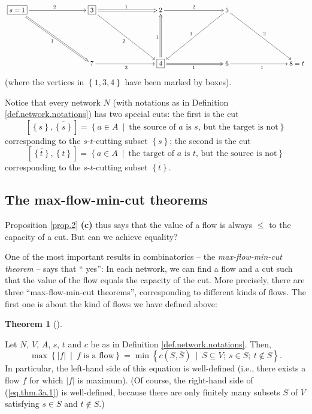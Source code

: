 \documentclass[numbers=enddot,12pt,final,onecolumn,notitlepage]{scrartcl}%
\theoremstyle{definition}
\newtheorem{theo}{Theorem}[section]
\newenvironment{theorem}[1][]
{\begin{theo}[#1]\begin{leftbar}}
{\end{leftbar}\end{theo}}
\begin{document}
\[%
\xymatrix@C=7pc@R=5pc{
\boxed{s = 1} \ar[r]^2 \ar@{=>}[dr]_1 & \boxed{3} \ar@{=>}[r]^1 \ar
[dr]_2 & 2 \ar[r]^2 & 5 \ar[dl]_1 \ar[dr]^2 \\
& 7 \ar[r]_3 & \boxed{4} \ar@{=>}[u]^1 \ar@{=>}[r]_1 & 6 \ar[r]_1 & 8 = t
}%
\]
(where the vertices in $\left\{  1,3,4\right\}  $ have been marked by boxes).

Notice that every network $N$ (with notations as in Definition
\ref{def.network.notations}) has two special cuts: the first is the cut
\[
\left[  \left\{  s\right\}  ,\overline{\left\{  s\right\}  }\right]  =\left\{
a\in A\ \mid\ \text{the source of }a\text{ is }s\text{, but the target is
not}\right\}
\]
corresponding to the $s$-$t$-cutting subset $\left\{  s\right\}  $; the second
is the cut%
\[
\left[  \overline{\left\{  t\right\}  },\left\{  t\right\}  \right]  =\left\{
a\in A\ \mid\ \text{the target of }a\text{ is }t\text{, but the source is
not}\right\}
\]
corresponding to the $s$-$t$-cutting subset $\overline{\left\{  t\right\}  }$.

\subsection{The max-flow-min-cut theorems}

Proposition \ref{prop.2} \textbf{(c)} thus says that the value of a flow is
always $\leq$ to the capacity of a cut. But can we achieve equality?

One of the most important results in combinatorics -- the
\textit{max-flow-min-cut theorem} -- says that \textquotedblleft
yes\textquotedblright: In each network, we can find a flow and a cut such that
the value of the flow equals the capacity of the cut. More precisely, there
are three \textquotedblleft max-flow-min-cut theorems\textquotedblright,
corresponding to different kinds of flows. The first one is about the kind of
flows we have defined above:

\begin{theorem}
\label{thm.3a}Let $N$, $V$, $A$, $s$, $t$ and $c$ be as in Definition
\ref{def.network.notations}. Then,%
\begin{equation}
\max\left\{  \left\vert f\right\vert \ \mid\ f\text{ is a flow}\right\}
=\min\left\{  c\left(  S,\overline{S}\right)  \ \mid\ S\subseteq V;\ s\in
S;\ t\notin S\right\}  . \label{eq.thm.3a.1}%
\end{equation}
In particular, the left-hand side of this equation is well-defined (i.e.,
there exists a flow $f$ for which $\left\vert f\right\vert $ is maximum). (Of
course, the right-hand side of (\ref{eq.thm.3a.1}) is well-defined, because
there are only finitely many subsets $S$ of $V$ satisfying $s\in S$ and
$t\notin S$.)
\end{theorem}
\end{document}
